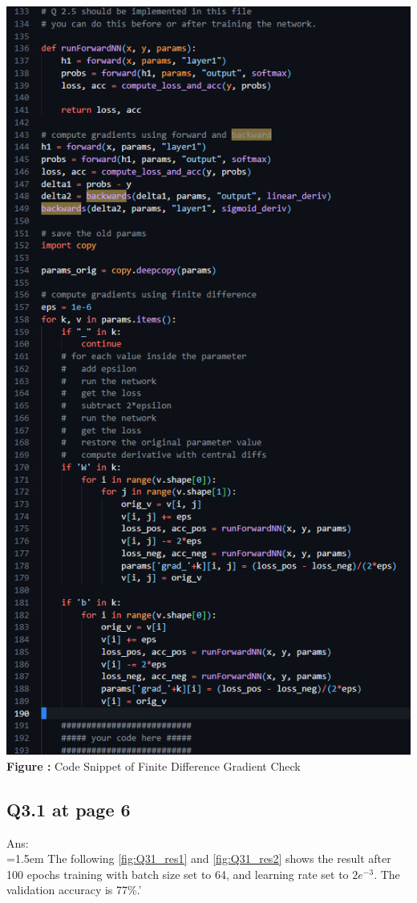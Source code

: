 \documentclass{article}
\begin{document}
	\begin{minipage}{1\linewidth}
		\centering
		\hspace{0.12\linewidth} 
		\includegraphics[width=0.7\linewidth, height=1.2\columnwidth]{./Q25_cns.png}  %
		\newline
		\textbf{Figure \thefigure:} Code Snippet of Finite Difference Gradient Check %
		\label{fig:Q25_cns}  %
	\end{minipage}	
	
	\newpage
	\subsection*{Q3.1 at page 6}
	Ans:\\
	\hangindent=1.5em \hspace{1.5em}  The following \autoref{fig:Q31_res1} and \autoref{fig:Q31_res2} shows the result after 100 epochs training with batch size set to 64, and learning rate set to $2e^{-3}$. The validation accuracy is 77\%.'
	\newline	
\end{document}
